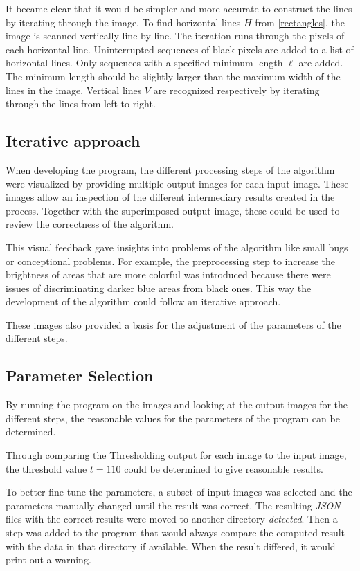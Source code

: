 \documentclass[serif,article,noparskip]{agse-thesis}
\begin{document}
It became clear that it would be simpler and more accurate to construct the
lines by iterating through the image. To find horizontal lines $H$ from
\ref{rectangles}, the image is scanned vertically line by line. The
iteration runs through the pixels of each horizontal line. Uninterrupted
sequences of black pixels are added to a list of horizontal lines. Only
sequences with a specified minimum length $\ell$ are added. The minimum length
should be slightly larger than the maximum width of the lines in the image.
Vertical lines $V$ are recognized respectively by iterating through the lines
from left to right.

\subsection{Iterative approach} \label{iterative}

When developing the program, the different processing steps of the algorithm
were visualized by providing multiple output images for each input image. These
images allow an inspection of the different intermediary results created in the
process. Together with the superimposed output image, these could be used to
review the correctness of the algorithm.

This visual feedback gave insights into problems of the algorithm like small
bugs or conceptional problems. For example, the preprocessing step to increase
the brightness of areas that are more colorful was introduced because there were
issues of discriminating darker blue areas from black ones. This way the
development of the algorithm could follow an iterative approach.

These images also provided a basis for the adjustment of the parameters of the
different steps.

\subsection{Parameter Selection} \label{parameter}

By running the program on the images and looking at the output images for the
different steps, the reasonable values for the parameters of the program can be
determined.

Through comparing the Thresholding output for each image to the input image, the
threshold value $t = 110$ could be determined to give reasonable results.

To better fine-tune the parameters, a subset of input images was selected and
the parameters manually changed until the result was correct. The resulting
\textit{JSON} files with the correct results were moved to another directory
\textit{detected}. Then a step was added to the program that would always
compare the computed result with the data in that directory if available. When
the result differed, it would print out a warning.
\end{document}

